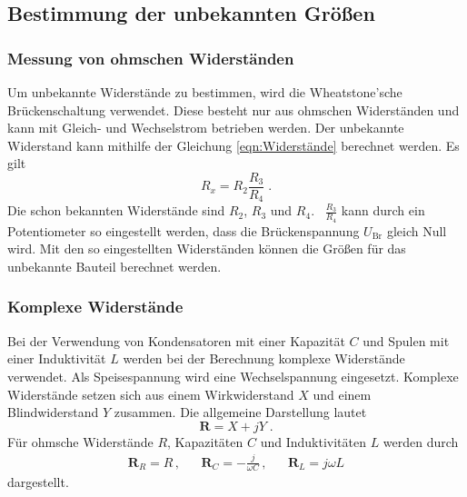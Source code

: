 \subsection{Bestimmung der unbekannten Größen}

    \subsubsection{Messung von ohmschen Widerständen} \label{sec:Wheatstone}

        

        Um unbekannte Widerstände zu bestimmen, wird die Wheatstone'sche Brückenschaltung verwendet.
        Diese besteht nur aus ohmschen Widerständen und kann mit Gleich- und Wechselstrom betrieben werden.
        Der unbekannte Widerstand kann mithilfe der Gleichung \eqref{eqn:Widerstände} berechnet werden.
        Es gilt
        \begin{equation}
            R_x = R_2 \frac{R_3}{R_4} \; . \label{eqn:Rx}
        \end{equation}
        Die schon bekannten Widerstände sind $R_2$, $R_3$ und $R_4$. \,
        $\frac{R_3}{R_4}$ kann durch ein Potentiometer so eingestellt werden,
        dass die Brückenspannung $U_\text{Br}$ gleich Null wird.
        Mit den so eingestellten Widerständen können die Größen für das unbekannte Bauteil berechnet werden.

    \subsubsection{Komplexe Widerstände}

        Bei der Verwendung von Kondensatoren mit einer Kapazität $C$ und Spulen mit einer Induktivität $L$ werden bei der Berechnung
        komplexe Widerstände verwendet. Als Speisespannung wird eine Wechselspannung eingesetzt.
        Komplexe Widerstände setzen sich aus einem Wirkwiderstand $X$ und einem Blindwiderstand $Y$ zusammen.
        Die allgemeine Darstellung lautet
        \begin{equation}
            \symbf{R} = X + jY \; .
        \end{equation}
        Für ohmsche Widerstände $R$, Kapazitäten $C$ und Induktivitäten $L$ werden durch
        \begin{align}
            \symbf{R}_R = R \,, && \symbf{R}_C = - \frac{j}{\omega C} \,, && \symbf{R}_L = j \omega L
        \end{align}
        dargestellt.

